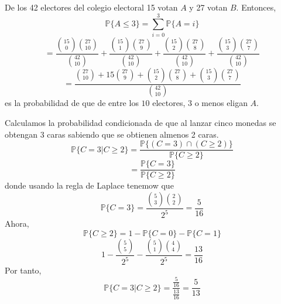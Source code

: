 \begin{ejr}
  De los 42 electores del colegio electoral 15 votan $A$ y 27 votan $B$. Entonces,
  \[ 
    \mathbb{P} \{ A \leq 3 \} = \sum_{i = 0}^{3} \mathbb{P} \{ A = i \} 
  \] 
  \[ 
    = \frac{\binom{15}{0} \binom{27}{10}}{\binom{42}{10}} +\frac{\binom{15}{1} \binom{27}{9}}{\binom{42}{10}} + \frac{\binom{15}{2} \binom{27}{8}}{\binom{42}{10}} + \frac{\binom{15}{3} \binom{27}{7}}{\binom{42}{10}}
  \] 
  \[  
    = \frac{\binom{27}{10} + 15 \binom{27}{9} + \binom{15}{2} \binom{27}{8} + \binom{15}{3} \binom{27}{7}}{\binom{42}{10}}
  \] 
  es la probabilidad de que de entre los $10$ electores, $3$ o menos eligan $A$.
\end{ejr}

\begin{ejr}
  Calculamos la probabilidad condicionada de que al lanzar cinco monedas se obtengan $3$ caras sabiendo que se obtienen almenos 2 caras.
  \[ 
    \mathbb{P} \{ C = 3 | C \geq 2 \} = \frac{\mathbb{P} \{ (C = 3) \cap (C \geq 2) \}}{\mathbb{P} \{ C \geq 2 \}}
  \] 
  \[ 
    = \frac{\mathbb{P} \{ C = 3 \}}{\mathbb{P} \{ C \geq 2 \}} 
  \] 
  donde usando la regla de Laplace tenemow que
  \[ 
    \mathbb{P} \{ C = 3 \} = \frac{\binom{5}{3} \binom{2}{2}}{2^{5}} = \frac{5}{16}
  \] 
  Ahora, 
  \[ 
    \mathbb{P} \{ C \geq 2 \} = 1 - \mathbb{P} \{ C = 0 \} - \mathbb{P} \{ C = 1 \}
  \] 
  \[ 
    1 - \frac{\binom{5}{5}}{2^{5}} -\frac{\binom{5}{1} \binom{4}{4}}{2^{5}} = \frac{13}{16}
  \] 
  Por tanto,
  \[ 
    \mathbb{P} \{ C = 3 | C \geq 2 \} = \frac{\frac{5}{16}}{\frac{13}{16}} = \frac{5}{13}
  \] 
\end{ejr}

